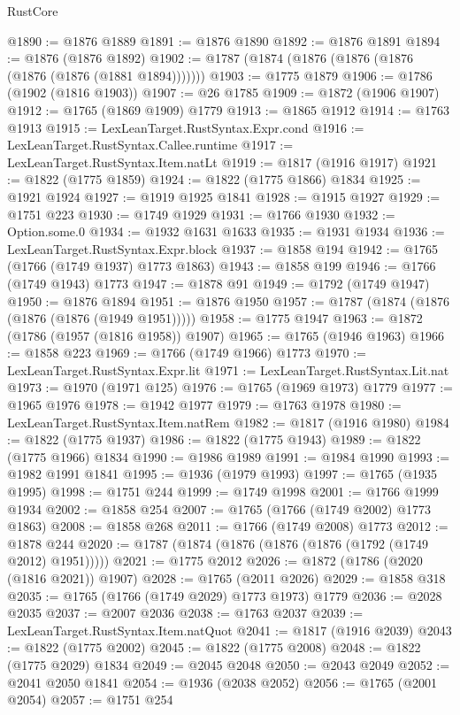 \begin{lexlean}{RustCore}
\begin{coremodule}
@1890 := @1876 @1889
@1891 := @1876 @1890
@1892 := @1876 @1891
@1894 := @1876 (@1876 @1892)
@1902 := @1787 (@1874 (@1876 (@1876 (@1876 (@1876 (@1876 (@1881 @1894)))))))
@1903 := @1775 @1879
@1906 := @1786 (@1902 (@1816 @1903))
@1907 := @26 @1785
@1909 := @1872 (@1906 @1907)
@1912 := @1765 (@1869 @1909) @1779
@1913 := @1865 @1912
@1914 := @1763 @1913
@1915 := LexLeanTarget.RustSyntax.Expr.cond
@1916 := LexLeanTarget.RustSyntax.Callee.runtime
@1917 := LexLeanTarget.RustSyntax.Item.natLt
@1919 := @1817 (@1916 @1917)
@1921 := @1822 (@1775 @1859)
@1924 := @1822 (@1775 @1866) @1834
@1925 := @1921 @1924
@1927 := @1919 @1925 @1841
@1928 := @1915 @1927
@1929 := @1751 @223
@1930 := @1749 @1929
@1931 := @1766 @1930
@1932 := Option.some.{0}
@1934 := @1932 @1631 @1633
@1935 := @1931 @1934
@1936 := LexLeanTarget.RustSyntax.Expr.block
@1937 := @1858 @194
@1942 := @1765 (@1766 (@1749 @1937) @1773 @1863)
@1943 := @1858 @199
@1946 := @1766 (@1749 @1943) @1773
@1947 := @1878 @91
@1949 := @1792 (@1749 @1947)
@1950 := @1876 @1894
@1951 := @1876 @1950
@1957 := @1787 (@1874 (@1876 (@1876 (@1876 (@1949 @1951)))))
@1958 := @1775 @1947
@1963 := @1872 (@1786 (@1957 (@1816 @1958)) @1907)
@1965 := @1765 (@1946 @1963)
@1966 := @1858 @223
@1969 := @1766 (@1749 @1966) @1773
@1970 := LexLeanTarget.RustSyntax.Expr.lit
@1971 := LexLeanTarget.RustSyntax.Lit.nat
@1973 := @1970 (@1971 @125)
@1976 := @1765 (@1969 @1973) @1779
@1977 := @1965 @1976
@1978 := @1942 @1977
@1979 := @1763 @1978
@1980 := LexLeanTarget.RustSyntax.Item.natRem
@1982 := @1817 (@1916 @1980)
@1984 := @1822 (@1775 @1937)
@1986 := @1822 (@1775 @1943)
@1989 := @1822 (@1775 @1966) @1834
@1990 := @1986 @1989
@1991 := @1984 @1990
@1993 := @1982 @1991 @1841
@1995 := @1936 (@1979 @1993)
@1997 := @1765 (@1935 @1995)
@1998 := @1751 @244
@1999 := @1749 @1998
@2001 := @1766 @1999 @1934
@2002 := @1858 @254
@2007 := @1765 (@1766 (@1749 @2002) @1773 @1863)
@2008 := @1858 @268
@2011 := @1766 (@1749 @2008) @1773
@2012 := @1878 @244
@2020 := @1787 (@1874 (@1876 (@1876 (@1876 (@1792 (@1749 @2012) @1951)))))
@2021 := @1775 @2012
@2026 := @1872 (@1786 (@2020 (@1816 @2021)) @1907)
@2028 := @1765 (@2011 @2026)
@2029 := @1858 @318
@2035 := @1765 (@1766 (@1749 @2029) @1773 @1973) @1779
@2036 := @2028 @2035
@2037 := @2007 @2036
@2038 := @1763 @2037
@2039 := LexLeanTarget.RustSyntax.Item.natQuot
@2041 := @1817 (@1916 @2039)
@2043 := @1822 (@1775 @2002)
@2045 := @1822 (@1775 @2008)
@2048 := @1822 (@1775 @2029) @1834
@2049 := @2045 @2048
@2050 := @2043 @2049
@2052 := @2041 @2050 @1841
@2054 := @1936 (@2038 @2052)
@2056 := @1765 (@2001 @2054)
@2057 := @1751 @254

\end{coremodule}
\end{lexlean}
